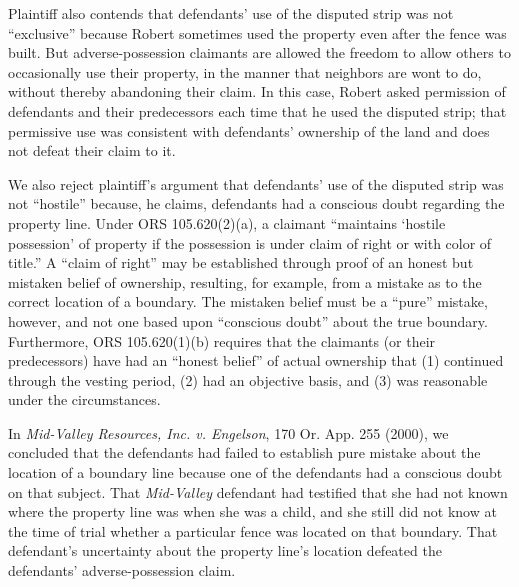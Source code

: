 Plaintiff also contends that defendants' use of the disputed strip was not
``exclusive'' because Robert sometimes used the property even after the fence
was built. But adverse-possession claimants are allowed the freedom to allow
others to occasionally use their property, in the manner that neighbors are
wont to do, without thereby abandoning their claim. In this case, Robert asked
permission of defendants and their predecessors each time that he used the
disputed strip; that permissive use was consistent with defendants' ownership
of the land and does not defeat their claim to it.

We also reject plaintiff's argument that defendants' use of the disputed strip
was not ``hostile'' because, he claims, defendants had a conscious doubt
regarding the property line. Under ORS 105.620(2)(a), a claimant ``maintains
`hostile possession' of property if the possession is under claim of right or
with color of title.'' A ``claim of right'' may be established through proof of
an honest but mistaken belief of ownership, resulting, for example, from a
mistake as to the correct location of a boundary. The mistaken belief must be a
``pure'' mistake, however, and not one based upon ``conscious doubt'' about the
true boundary. Furthermore, ORS 105.620(1)(b) requires that the claimants (or
their predecessors) have had an ``honest belief'' of actual ownership that (1)
continued through the vesting period, (2) had an objective basis, and (3) was
reasonable under the circumstances.

In \textit{Mid-Valley Resources, Inc. v. Engelson}, 170 Or. App. 255 (2000), we
concluded that the defendants had failed to establish pure mistake about the
location of a boundary line because one of the defendants had a conscious doubt
on that subject. That \textit{Mid-Valley} defendant had testified that she had
not known where the property line was when she was a child, and she still did
not know at the time of trial whether a particular fence was located on that
boundary. That defendant's uncertainty about the property line's location
defeated the defendants' adverse-possession claim.

